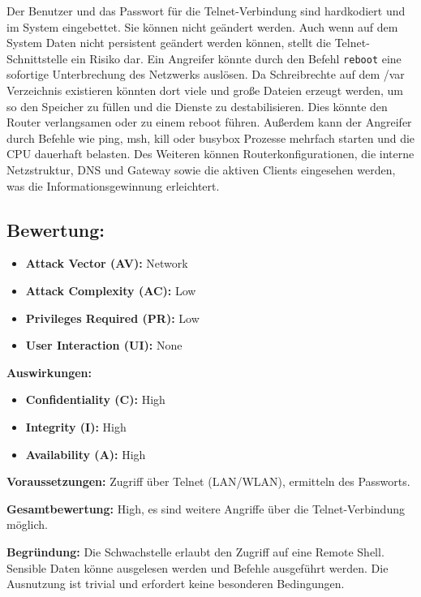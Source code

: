 	Der Benutzer und das Passwort für die Telnet-Verbindung sind hardkodiert und im System eingebettet. Sie können nicht geändert werden.
	Auch wenn auf dem System Daten nicht persistent geändert werden können, stellt die Telnet-Schnittstelle ein
	Risiko dar. Ein Angreifer könnte durch den Befehl \texttt{reboot} eine sofortige Unterbrechung des Netzwerks
	auslösen. Da Schreibrechte auf dem /var Verzeichnis existieren könnten dort viele und große Dateien erzeugt werden, um so den 
	Speicher zu füllen und die Dienste zu destabilisieren. Dies könnte den Router verlangsamen oder zu einem 
	reboot führen. Außerdem kann der Angreifer durch Befehle wie ping, msh, kill oder busybox Prozesse mehrfach starten und die CPU dauerhaft belasten.
	Des Weiteren können Routerkonfigurationen, die interne Netzstruktur, DNS und Gateway sowie die aktiven Clients
	eingesehen werden, was die Informationsgewinnung erleichtert. \cite{nvdcve202642375ab,telnetprotocolspecificationb}

	\subsection{Bewertung:}
	\label{sec:Bewertung-Telnet}

	\begin{itemize}
		\item \textbf{Attack Vector (AV):} Network
		\item \textbf{Attack Complexity (AC):} Low
		\item \textbf{Privileges Required (PR):} Low
		\item \textbf{User Interaction (UI):} None
	\end{itemize}

	\textbf{Auswirkungen:}
	\begin{itemize}
		\item \textbf{Confidentiality (C):} High
		\item \textbf{Integrity (I):} High
		\item \textbf{Availability (A):} High
	\end{itemize}

	\textbf{Voraussetzungen:}  
	Zugriff über Telnet (LAN/WLAN), ermitteln des Passworts.

	\textbf{Gesamtbewertung:}  
	High, es sind weitere Angriffe über die Telnet-Verbindung möglich.

	\textbf{Begründung:}  
	Die Schwachstelle erlaubt den Zugriff auf eine Remote Shell.
	Sensible Daten könne ausgelesen werden und Befehle ausgeführt werden.
	Die Ausnutzung ist trivial und erfordert keine besonderen Bedingungen. 

